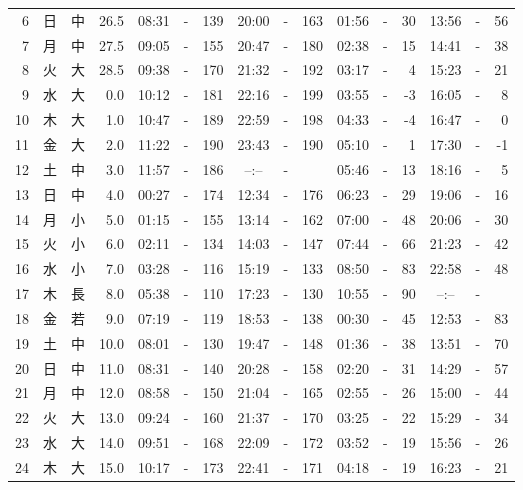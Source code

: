 \documentclass[12pt.a4j]{jsarticle}
\begin{document}
\begin{center}
\begin{table}[ht]
\begin{tabular}{|rc|cr|ccrccr|ccrccr|}
 6 & 日 & 中 & 26.5 &  08:31 &-& 139  &  20:00 &-& 163  &   01:56 &-&  30  &   13:56 &-&  56  \\
 7 & 月 & 中 & 27.5 &  09:05 &-& 155  &  20:47 &-& 180  &   02:38 &-&  15  &   14:41 &-&  38  \\
 8 & 火 & 大 & 28.5 &  09:38 &-& 170  &  21:32 &-& 192  &   03:17 &-&   4  &   15:23 &-&  21  \\
 9 & 水 & 大 &  0.0 &  10:12 &-& 181  &  22:16 &-& 199  &   03:55 &-&  -3  &   16:05 &-&   8  \\
10 & 木 & 大 &  1.0 &  10:47 &-& 189  &  22:59 &-& 198  &   04:33 &-&  -4  &   16:47 &-&   0  \\
11 & 金 & 大 &  2.0 &  11:22 &-& 190  &  23:43 &-& 190  &   05:10 &-&   1  &   17:30 &-&  -1  \\
12 & 土 & 中 &  3.0 &  11:57 &-& 186  &  --:-- &-&     &   05:46 &-&  13  &   18:16 &-&   5  \\
13 & 日 & 中 &  4.0 &  00:27 &-& 174  &  12:34 &-& 176  &   06:23 &-&  29  &   19:06 &-&  16  \\
14 & 月 & 小 &  5.0 &  01:15 &-& 155  &  13:14 &-& 162  &   07:00 &-&  48  &   20:06 &-&  30  \\
15 & 火 & 小 &  6.0 &  02:11 &-& 134  &  14:03 &-& 147  &   07:44 &-&  66  &   21:23 &-&  42  \\
16 & 水 & 小 &  7.0 &  03:28 &-& 116  &  15:19 &-& 133  &   08:50 &-&  83  &   22:58 &-&  48  \\
17 & 木 & 長 &  8.0 &  05:38 &-& 110  &  17:23 &-& 130  &   10:55 &-&  90  &   --:-- &-&     \\
18 & 金 & 若 &  9.0 &  07:19 &-& 119  &  18:53 &-& 138  &   00:30 &-&  45  &   12:53 &-&  83  \\
19 & 土 & 中 & 10.0 &  08:01 &-& 130  &  19:47 &-& 148  &   01:36 &-&  38  &   13:51 &-&  70  \\
20 & 日 & 中 & 11.0 &  08:31 &-& 140  &  20:28 &-& 158  &   02:20 &-&  31  &   14:29 &-&  57  \\
21 & 月 & 中 & 12.0 &  08:58 &-& 150  &  21:04 &-& 165  &   02:55 &-&  26  &   15:00 &-&  44  \\
22 & 火 & 大 & 13.0 &  09:24 &-& 160  &  21:37 &-& 170  &   03:25 &-&  22  &   15:29 &-&  34  \\
23 & 水 & 大 & 14.0 &  09:51 &-& 168  &  22:09 &-& 172  &   03:52 &-&  19  &   15:56 &-&  26  \\
24 & 木 & 大 & 15.0 &  10:17 &-& 173  &  22:41 &-& 171  &   04:18 &-&  19  &   16:23 &-&  21  \\

\end{tabular}
\end{table}
\end{center}
\end{document}
